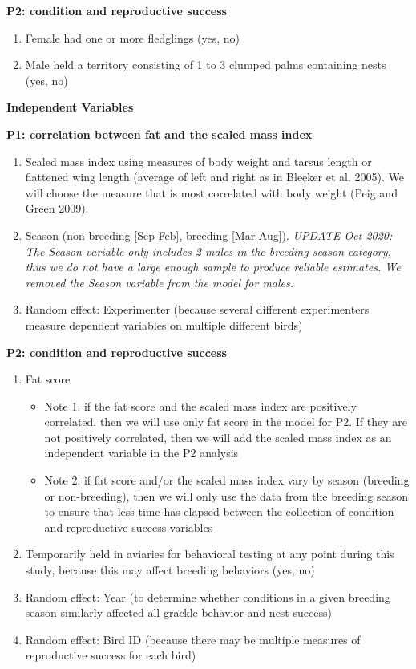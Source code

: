 \documentclass[
]{article}
\providecommand{\tightlist}{%
  \setlength{\itemsep}{0pt}\setlength{\parskip}{0pt}}
\begin{document}
\textbf{P2: condition and reproductive success}

\begin{enumerate}
\def\labelenumi{\arabic{enumi})}
\item
  Female had one or more fledglings (yes, no)
\item
  Male held a territory consisting of 1 to 3 clumped palms containing
  nests (yes, no)
\end{enumerate}

\textbf{Independent Variables}

\textbf{P1: correlation between fat and the scaled mass index}

\begin{enumerate}
\def\labelenumi{\arabic{enumi})}
\item
  Scaled mass index using measures of body weight and tarsus length or
  flattened wing length (average of left and right as in Bleeker et al.
  2005). We will choose the measure that is most correlated with body
  weight (Peig and Green 2009).
\item
  Season (non-breeding {[}Sep-Feb{]}, breeding {[}Mar-Aug{]}).
  \emph{UPDATE Oct 2020: The Season variable only includes 2 males in
  the breeding season category, thus we do not have a large enough
  sample to produce reliable estimates. We removed the Season variable
  from the model for males.}
\item
  Random effect: Experimenter (because several different experimenters
  measure dependent variables on multiple different birds)
\end{enumerate}

\textbf{P2: condition and reproductive success}

\begin{enumerate}
\def\labelenumi{\arabic{enumi})}
\item
  Fat score

  \begin{itemize}
  \tightlist
  \item
    Note 1: if the fat score and the scaled mass index are positively
    correlated, then we will use only fat score in the model for P2. If
    they are not positively correlated, then we will add the scaled mass
    index as an independent variable in the P2 analysis
  \item
    Note 2: if fat score and/or the scaled mass index vary by season
    (breeding or non-breeding), then we will only use the data from the
    breeding season to ensure that less time has elapsed between the
    collection of condition and reproductive success variables
  \end{itemize}
\item
  Temporarily held in aviaries for behavioral testing at any point
  during this study, because this may affect breeding behaviors (yes,
  no)
\item
  Random effect: Year (to determine whether conditions in a given
  breeding season similarly affected all grackle behavior and nest
  success)
\item
  Random effect: Bird ID (because there may be multiple measures of
  reproductive success for each bird)
\end{enumerate}
\end{document}
